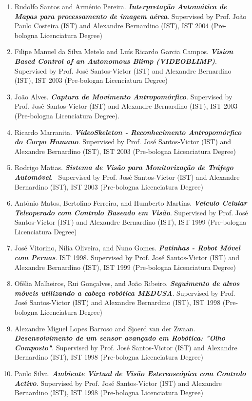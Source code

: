 \documentclass[
]{article}
\begin{document}
\begin{enumerate}
  Degree).
\item
  Rudolfo Santos and Arménio Pereira. \emph{\textbf{Interpretação
  Automática de Mapas para processamento de imagem aérea}}. Supervised
  by Prof. João Paulo Costeira (IST) and Alexandre Bernardino (IST), IST
  2004 (Pre-bologna Licenciatura Degree)
\item
  Filipe Manuel da Silva Metelo and Luís Ricardo Garcia Campos.
  \emph{\textbf{Vision Based Control of an Autonomous Blimp
  (VIDEOBLIMP)}}. Supervised by Prof. José Santos-Victor (IST) and
  Alexandre Bernardino (IST), IST 2003 (Pre-bologna Licenciatura Degree)
\item
  João Alves. \emph{\textbf{Captura de Movimento Antropomórfico}}.
  Supervised by Prof. José Santos-Victor (IST) and Alexandre Bernardino
  (IST), IST 2003 (Pre-bologna Licenciatura Degree).
\item
  Ricardo Marranita. \emph{\textbf{VideoSkeleton - Reconhecimento
  Antropomórfico do Corpo Humano}}. Supervised by Prof. José
  Santos-Victor (IST) and Alexandre Bernardino (IST), IST 2003
  (Pre-bologna Licenciatura Degree)
\item
  Rodrigo Matias. \emph{\textbf{Sistema de Visão para Monitorização de
  Tráfego Automóvel}}.~ Supervised by Prof. José Santos-Victor (IST) and
  Alexandre Bernardino (IST), IST 2003 (Pre-bologna Licenciatura Degree)
\item
  António Matos, Bertolino Ferreira, and Humberto Martins.
  \emph{\textbf{Veículo Celular Teleoperado com Controlo Baseado em
  Visão}}. Supervised by Prof. José Santos-Victor (IST) and Alexandre
  Bernardino (IST), IST 1999 (Pre-bologna Licenciatura Degree)
\item
  José Vitorino, Nília Oliveira, and Nuno Gomes. \emph{\textbf{Patinhas
  - Robot Móvel com Pernas}}. IST 1998. Supervised by Prof. José
  Santos-Victor (IST) and Alexandre Bernardino (IST), IST 1999
  (Pre-bologna Licenciatura Degree)
\item
  Ofélia Malheiros, Rui Gonçalves, and João Ribeiro.
  \emph{\textbf{Seguimento de alvos móveis utilizando a cabeça robótica
  MEDUSA}}. Supervised by Prof. José Santos-Victor (IST) and Alexandre
  Bernardino (IST), IST 1998 (Pre-bologna Licenciatura Degree)
\item
  Alexandre Miguel Lopes Barroso and Sjoerd van der Zwaan.
  \emph{\textbf{Desenvolvimento de um sensor avançado em Robótica: "Olho
  Composto"}}. Supervised by Prof. José Santos-Victor (IST) and
  Alexandre Bernardino (IST), IST 1998 (Pre-bologna Licenciatura Degree)
\item
  Paulo Silva. \emph{\textbf{Ambiente Virtual de Visão Estereoscópica
  com Controlo Activo}}. Supervised by Prof. José Santos-Victor (IST)
  and Alexandre Bernardino (IST), IST 1998 (Pre-bologna Licenciatura
  Degree)
\end{enumerate}
\end{document}
